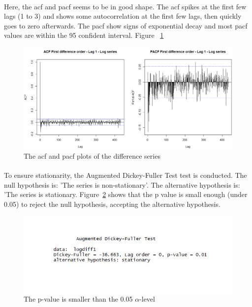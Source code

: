 \documentclass[12pt]{article}
\begin{document}
\paragraph{}
Here, the acf and pacf seems to be in good shape. The acf spikes at the first few lags (1 to 3)  and shows some autocorrelation at the first few lags, then quickly goes to zero afterwards. The pacf show signs of exponential decay and most pacf values are within the 95 confident interval. Figure ~\ref{fig:figure7}
\begin{figure}[H]
  \includegraphics[width=\linewidth]{figure7.png}
  \caption{The acf and pacf plots of the difference series}
  \label{fig:figure7}
\end{figure}

\paragraph{}
To ensure stationarity, the Augmented Dickey-Fuller Test test is conducted. The null hypothesis is: 'The series is non-stationary'. The alternative hypothesis is: 'The series is stationary. Figure~\ref{fig:figure8}  shows that the p value is small enough (under 0.05) to reject the null hypothesis, accepting the alternative hypothesis. 
\begin{figure}[H]
  \includegraphics[width=\linewidth]{figure8.png}
  \caption{The p-value is smaller than the 0.05 $\alpha$-level }
  \label{fig:figure8}
\end{figure}
\end{document}

